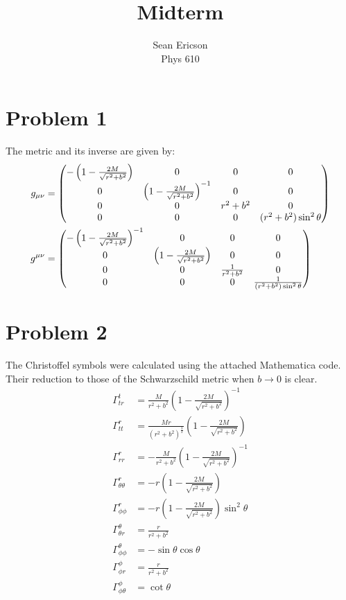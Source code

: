\documentclass[12pt]{article}
\newcommand{\chrissym}[3]{\Gamma_{#2#3}^#1}
\begin{document}
\title{Midterm}
\author{Sean Ericson \\ Phys 610}
\maketitle

\section*{Problem 1}
The metric and its inverse are given by:
\begin{align*}
    g_{\mu\nu} &= \mqty(-\left(1 - \frac{2M}{\sqrt{r^2 + b^2}}\right) & 0 & 0 & 0 \\ 0 & \left(1 - \frac{2M}{\sqrt{r^2 + b^2}}\right)^{-1} & 0 & 0 \\ 0 & 0 & r^2 + b^2 & 0 \\ 0 & 0 & 0 & (r^2 + b^2)\sin^2\theta) \\
    g^{\mu\nu} &= \mqty(-\left(1 - \frac{2M}{\sqrt{r^2 + b^2}}\right)^{-1} & 0 & 0 & 0 \\ 0 & \left(1 - \frac{2M}{\sqrt{r^2 + b^2}}\right) & 0 & 0 \\ 0 & 0 & \frac{1}{r^2 + b^2} & 0 \\ 0 & 0 & 0 & \frac{1}{(r^2 + b^2)\sin^2\theta}) \\
\end{align*}


\section*{Problem 2}
The Christoffel symbols were calculated using the attached Mathematica code. Their reduction to those of the Schwarzschild metric when $b \to 0$ is clear.
\begin{align*}
    \chrissym{t}{t}{r} &= \frac{M}{r^2 + b^2}\left(1 - \frac{2M}{\sqrt{r^2 + b^2}}\right)^{-1} \\
    \chrissym{r}{t}{t} &= \frac{Mr}{(r^2 + b^2)^\frac{3}{2}}\left(1 - \frac{2M}{\sqrt{r^2 + b^2}}\right) \\
    \chrissym{r}{r}{r} &= -\frac{M}{r^2 + b^2}\left(1 - \frac{2M}{\sqrt{r^2 + b^2}}\right)^{-1} \\
    \chrissym{r}{\theta}{\theta} &= -r\left(1 - \frac{2M}{\sqrt{r^2 + b^2}}\right) \\
    \chrissym{r}{\phi}{\phi} &= -r\left(1 - \frac{2M}{\sqrt{r^2 + b^2}}\right) \sin^2\theta \\
    \chrissym{\theta}{\theta}{r} &= \frac{r}{r^2 + b^2}  \\
    \chrissym{\theta}{\phi}{\phi} &= -\sin\theta\cos\theta \\
    \chrissym{\phi}{\phi}{r} &= \frac{r}{r^2 + b^2} \\
    \chrissym{\phi}{\phi}{\theta} &= \cot\theta
\end{align*}
\end{document}
